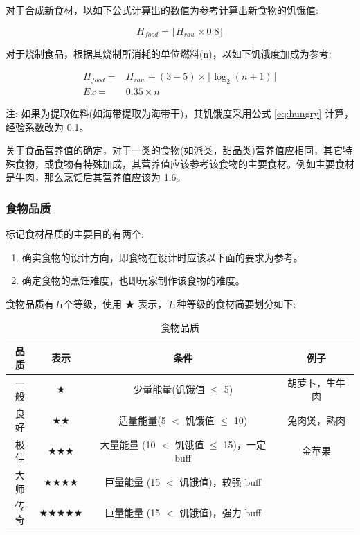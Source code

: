 对于合成新食材，以如下公式计算出的数值为参考计算出新食物的饥饿值:

\begin{equation}
    \label{eq:hungry}
    H_{food} = \lfloor H_{raw} \times 0.8 \rfloor 
\end{equation}

对于烧制食品，根据其烧制所消耗的单位燃料(n)，以如下饥饿度加成为参考:

\begin{equation}
    \begin{aligned}
        \label{eq:fire}
        H_{food} = & H_{raw} + (3-5)\times \lfloor \log_{2}(n+1) \rfloor \\
        Ex = & 0.35 \times n
    \end{aligned}
\end{equation}

注: 如果为提取佐料(如海带提取为海带干)，其饥饿度采用公式 \ref{eq:hungry} 计算，经验系数改为 0.1。

关于食品营养值的确定，对于一类的食物(如派类，甜品类)营养值应相同，其它特殊食物，或食物有特殊加成，其营养值应该参考该食物的主要食材。例如主要食材是牛肉，那么烹饪后其营养值应该为 1.6。

\subsubsection{食物品质}

标记食材品质的主要目的有两个:
\begin{enumerate}
    \item 确实食物的设计方向，即食物在设计时应该以下面的要求为参考。
    \item 确定食物的烹饪难度，也即玩家制作该食物的难度。
\end{enumerate}

食物品质有五个等级，使用 ★ 表示，五种等级的食材简要划分如下:

\begin{center}
    \setlength{\tabcolsep}{4mm}
    \begin{longtable}{c|c|c|c}
        \caption{食物品质} \\
        \toprule
        \textbf{品质} & \textbf{表示} & \textbf{条件} & 例子 \\
        \midrule
        一般 & $\bigstar$ & 少量能量(饥饿值 $\leq$ 5) & 胡萝卜，生牛肉 \\
        良好 & $\bigstar \bigstar$ & 适量能量(5 $<$ 饥饿值 $\leq$ 10) & 兔肉煲，熟肉  \\
        极佳 & $\bigstar \bigstar \bigstar$ & 大量能量 (10 $<$ 饥饿值 $\leq$ 15)，一定 buff & 金苹果 \\
        大师 & $\bigstar \bigstar \bigstar \bigstar$ & 巨量能量 (15 $<$ 饥饿值)，较强 buff &   \\
        传奇 & $\bigstar \bigstar \bigstar \bigstar \bigstar$ & 巨量能量 (15 $<$ 饥饿值)，强力 buff &   \\
        \bottomrule
    \end{longtable}
\end{center}

